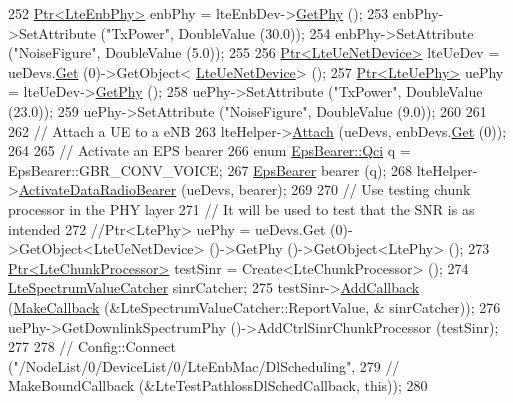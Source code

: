 \begin{DoxyCode}
252   \hyperlink{classns3_1_1Ptr}{Ptr<LteEnbPhy>} enbPhy = lteEnbDev->\hyperlink{classns3_1_1LteEnbNetDevice_a58db72130e0740f16a5e03b22e4a10a4}{GetPhy} ();
253   enbPhy->SetAttribute (\textcolor{stringliteral}{"TxPower"}, DoubleValue (30.0));
254   enbPhy->SetAttribute (\textcolor{stringliteral}{"NoiseFigure"}, DoubleValue (5.0));
255   
256   \hyperlink{classns3_1_1Ptr}{Ptr<LteUeNetDevice>} lteUeDev = ueDevs.\hyperlink{classns3_1_1NetDeviceContainer_a677d62594b5c9d2dea155cc5045f4d0b}{Get} (0)->GetObject<
      \hyperlink{classns3_1_1LteUeNetDevice}{LteUeNetDevice}> ();
257   \hyperlink{classns3_1_1Ptr}{Ptr<LteUePhy>} uePhy = lteUeDev->\hyperlink{classns3_1_1LteUeNetDevice_a2a9940a1e457a8bf3dae87fed4199c7a}{GetPhy} ();
258   uePhy->SetAttribute (\textcolor{stringliteral}{"TxPower"}, DoubleValue (23.0));
259   uePhy->SetAttribute (\textcolor{stringliteral}{"NoiseFigure"}, DoubleValue (9.0));
260   
261   
262   \textcolor{comment}{// Attach a UE to a eNB}
263   lteHelper->\hyperlink{classns3_1_1LteHelper_a9466743f826aa2652a87907b7f0a1c87}{Attach} (ueDevs, enbDevs.\hyperlink{classns3_1_1NetDeviceContainer_a677d62594b5c9d2dea155cc5045f4d0b}{Get} (0));
264 
265   \textcolor{comment}{// Activate an EPS bearer}
266   \textcolor{keyword}{enum} \hyperlink{structns3_1_1EpsBearer_aecf0c67109c5eb4ec0b07226fff5885e}{EpsBearer::Qci} q = EpsBearer::GBR\_CONV\_VOICE;
267   \hyperlink{structns3_1_1EpsBearer}{EpsBearer} bearer (q);
268   lteHelper->\hyperlink{classns3_1_1LteHelper_ac896e16cf162e4beeaa292d39ab1b700}{ActivateDataRadioBearer} (ueDevs, bearer);
269   
270   \textcolor{comment}{// Use testing chunk processor in the PHY layer}
271   \textcolor{comment}{// It will be used to test that the SNR is as intended}
272   \textcolor{comment}{//Ptr<LtePhy> uePhy = ueDevs.Get (0)->GetObject<LteUeNetDevice> ()->GetPhy ()->GetObject<LtePhy> ();}
273   \hyperlink{classns3_1_1Ptr}{Ptr<LteChunkProcessor>} testSinr = Create<LteChunkProcessor> ();
274   \hyperlink{classns3_1_1LteSpectrumValueCatcher}{LteSpectrumValueCatcher} sinrCatcher;
275   testSinr->\hyperlink{classns3_1_1LteChunkProcessor_a122d4a00d72e68a0a8b2cbdd165cdfd8}{AddCallback} (\hyperlink{group__makecallbackmemptr_ga9376283685aa99d204048d6a4b7610a4}{MakeCallback} (&LteSpectrumValueCatcher::ReportValue, &
      sinrCatcher));
276   uePhy->GetDownlinkSpectrumPhy ()->AddCtrlSinrChunkProcessor (testSinr);
277    
278 \textcolor{comment}{//   Config::Connect ("/NodeList/0/DeviceList/0/LteEnbMac/DlScheduling",}
279 \textcolor{comment}{//                    MakeBoundCallback (&LteTestPathlossDlSchedCallback, this));}
280                    

\end{DoxyCode}
